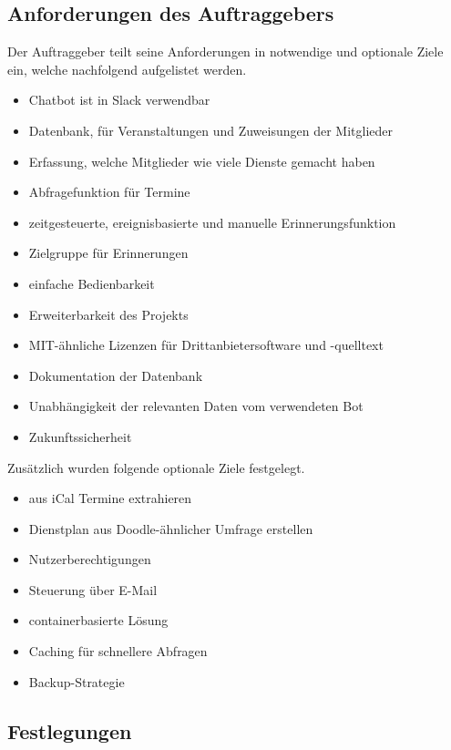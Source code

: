 \label{anforderungen}
\subsection{Anforderungen des Auftraggebers}
Der Auftraggeber teilt seine Anforderungen in notwendige und optionale Ziele ein, welche nachfolgend aufgelistet werden.

\begin{itemize}
	\item Chatbot ist in Slack verwendbar
	\item Datenbank, für Veranstaltungen und Zuweisungen der Mitglieder
	\item Erfassung, welche Mitglieder wie viele Dienste gemacht haben
	\item Abfragefunktion für Termine
	\item zeitgesteuerte, ereignisbasierte und manuelle Erinnerungsfunktion
	\item Zielgruppe für Erinnerungen
	\item einfache Bedienbarkeit
	\item Erweiterbarkeit des Projekts
	\item MIT-ähnliche Lizenzen für Drittanbietersoftware und -quelltext
	\item Dokumentation der Datenbank
	\item Unabhängigkeit der relevanten Daten vom verwendeten Bot
	\item Zukunftssicherheit
\end{itemize}


Zusätzlich wurden folgende optionale Ziele festgelegt.
\begin{itemize}
	\item aus iCal Termine extrahieren
	\item Dienstplan aus Doodle-ähnlicher Umfrage erstellen
	\item Nutzerberechtigungen
	\item Steuerung über E-Mail
	\item containerbasierte Lösung
	\item Caching für schnellere Abfragen
	\item Backup-Strategie
\end{itemize}


\subsection{Festlegungen}

